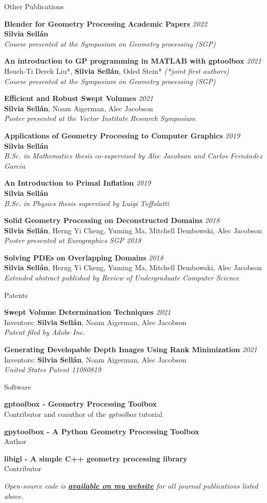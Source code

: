 \documentclass{resume}
\newcommand{\software}[2]{
    {\bf #1}\\ 
    {\small#2 }}
\newcommand{\publication}[5]{
    {\bf #1} \hfill {\em \small #2} \\ %
    {\small#3}{\small \bf Silvia Sell\'{a}n}{\small #4} \\ %
    {\small \it #5} %
}
\newcommand{\patent}[5]{
    {\bf #1} \hfill {\em \small #2} \\ %
    {\small Inventors: #3}{\small \bf Silvia Sell\'{a}n}{\small #4} \\ %
    {\small \it #5} %
}
\begin{document}
\begin{rSection}{Other Publications}

\publication{Blender for Geometry Processing Academic Papers}{2022}{}{}{Course presented at the Symposium on Geometry processing (SGP)}

\publication{An introduction to GP programming in MATLAB with gptoolbox}{2021}{ 
Hsueh-Ti Derek Liu*, }{*, Oded Stein* \textit{(*joint first authors)}}{Course presented at the Symposium on Geometry processing (SGP)}

\publication{Efficient and Robust Swept Volumes}{2021}{}{, Noam Aigerman, Alec Jacobson}{Poster presented at the Vector Institute Research Symposium}

\publication{Applications of Geometry Processing to Computer Graphics}{2019}{}{}{B.Sc. in Mathematics thesis co-supervised by Alec Jacobson and Carlos Fernández García}

\publication{An Introduction to Primal Inflation}{2019}{}{}{B.Sc. in Physics thesis supervised by Luigi Toffolatti}

\publication{Solid Geometry Processing on Deconstructed Domains}{2018}{}{, Herng Yi Cheng, Yuming Ma, Mitchell Dembowski, Alec Jacobson}
{Poster presented at Eurographics SGP 2018}

\publication{Solving PDEs on Overlapping Domains}{2018}{}{, Herng Yi Cheng, Yuming Ma, Mitchell Dembowski, Alec Jacobson}{Extended abstract published by Review of Undergraduate Computer Science}

\end{rSection}

\begin{rSection}{Patents}

\patent{Swept Volume Determination Techniques}{2021}{}{, Noam Aigerman, Alec Jacobson}{Patent filed by Adobe Inc.}

\patent{Generating Developable Depth Images Using Rank Minimization}{2021}{}{, Noam Aigerman, Alec Jacobson}{United States Patent 11080819}


\end{rSection}

\begin{rSection}{Software}

\software{gptoolbox - Geometry Processing Toolbox}{Contributor and coauthor of the \textit{gptoolbox} tutorial}

\software{gpytoolbox - A Python Geometry Processing Toolbox}{Author}

\software{libigl - A simple C++ geometry processing library}{Contributor}


\textit{Open-source code is \href{http://dgp.toronto.edu/~sgsellan/}{\textbf{available on my website}} for all journal publications listed above.}

\end{rSection}
\end{document}
